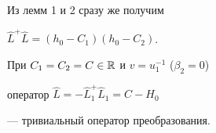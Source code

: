 Из лемм 1 и 2 сразу же получим





\begin{cornonum}


$\widehat{L}^{+}\widehat{L}=(h_0-C_1)(h_0-C_2)$.


\end{cornonum}





\begin{note}


При $C_1=C_2=C\in {\Bbb R}$ и $v=u_1^{-1}$ ($\beta _2=0$)


оператор $\widehat{L}=-\widehat{L}_1^{+}\widehat{L}_1=C-H_0$


--- тривиальный оператор преобразования.


\end{note}





